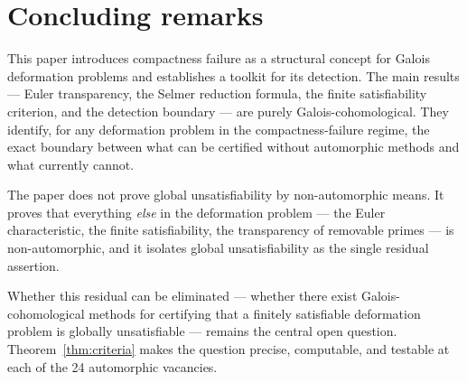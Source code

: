 \documentclass[12pt]{amsart}
\theoremstyle{definition}
\theoremstyle{remark}
\begin{document}
\section{Concluding remarks}
\label{sec:concluding}

This paper introduces compactness failure as a structural concept for Galois deformation problems and establishes a toolkit for its detection. The main results --- Euler transparency, the Selmer reduction formula, the finite satisfiability criterion, and the detection boundary --- are purely Galois-cohomological. They identify, for any deformation problem in the compactness-failure regime, the exact boundary between what can be certified without automorphic methods and what currently cannot.

The paper does not prove global unsatisfiability by non-automorphic means. It proves that everything \emph{else} in the deformation problem --- the Euler characteristic, the finite satisfiability, the transparency of removable primes --- is non-automorphic, and it isolates global unsatisfiability as the single residual assertion.

Whether this residual can be eliminated --- whether there exist Galois-cohomological methods for certifying that a finitely satisfiable deformation problem is globally unsatisfiable --- remains the central open question. Theorem~\ref{thm:criteria} makes the question precise, computable, and testable at each of the 24 automorphic vacancies.

\bigskip
\end{document}
